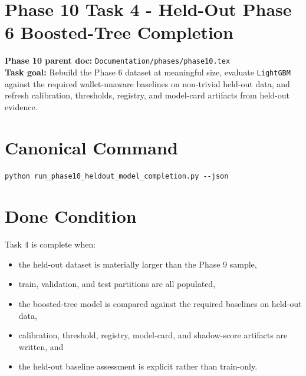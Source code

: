 \documentclass{article}
\begin{document}
\section*{Phase 10 Task 4 - Held-Out Phase 6 Boosted-Tree Completion}

\textbf{Phase 10 parent doc:} \texttt{Documentation/phases/phase10.tex}\\
\textbf{Task goal:} Rebuild the Phase 6 dataset at meaningful size, evaluate \texttt{LightGBM} against the required wallet-unaware baselines on non-trivial held-out data, and refresh calibration, thresholds, registry, and model-card artifacts from held-out evidence.

\section*{Canonical Command}
\begin{verbatim}
python run_phase10_heldout_model_completion.py --json
\end{verbatim}

\section*{Done Condition}
Task 4 is complete when:
\begin{itemize}
\item the held-out dataset is materially larger than the Phase 9 sample,
\item train, validation, and test partitions are all populated,
\item the boosted-tree model is compared against the required baselines on held-out data,
\item calibration, threshold, registry, model-card, and shadow-score artifacts are written, and
\item the held-out baseline assessment is explicit rather than train-only.
\end{itemize}
\end{document}
